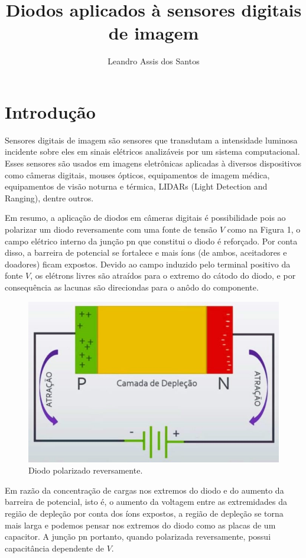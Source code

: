 \documentclass[10pt,a4paper,twocolumn]{article}
\title{\textbf{Diodos aplicados à sensores digitais de imagem}}
\author{Leandro Assis dos Santos}
\begin{document}
\pagestyle{empty}
\maketitle

\section*{Introdução}
		Sensores digitais de imagem são sensores que transdutam a intensidade luminosa incidente sobre eles em sinais elétricos analizáveis por um sistema computacional. Esses sensores são usados em imagens eletrônicas aplicadas à diversos dispositivos como câmeras digitais, mouses ópticos, equipamentos de imagem médica, equipamentos de visão noturna e térmica, LIDARs (Light Detection and Ranging), dentre outros.
				
		Em resumo, a aplicação de diodos em câmeras digitais é possibilidade pois ao polarizar um diodo reversamente com uma fonte de tensão $V$ como na Figura 1, o campo elétrico interno da junção pn que constitui o diodo é reforçado. Por conta disso, a barreira de potencial se fortalece e mais íons (de ambos, aceitadores e doadores) ficam expostos. Devido ao campo induzido pelo terminal positivo da fonte $V$, os elétrons livres são atraídos para o extremo do cátodo do diodo, e por consequência as lacunas são direciondas para o anôdo do componente.
		
		\begin{figure}[!h]
			\centering
			\includegraphics[scale=0.2]{imagens/diodo_polarizado_reversamente.jpg}
			\caption{Diodo polarizado reversamente.}
		\end{figure}
		Em razão da concentração de cargas nos extremos do diodo e do aumento da barreira de potencial, isto é, o aumento da voltagem entre as extremidades da região de depleção por conta dos íons expostos, a região de depleção se torna mais larga e podemos pensar nos extremos do diodo como as placas de um capacitor. A junção pn portanto, quando polarizada reversamente, possui capacitância dependente de $V$.
		
\end{document}
